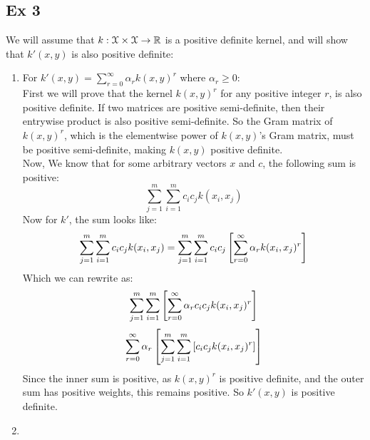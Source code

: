 \documentclass[12pt]{article}
\begin{document}
\newpage

\subsection*{Ex 3}
We will assume that $k: \mathcal{X} \times \mathcal{X} \to \mathbb{R}$
is a positive definite kernel, and
will show that $k'(x, y)$ is also positive definite:
\begin{enumerate}[label = \letters]
    \item 
    For $k'(x, y) = \sum_{r=0}^\infty
    \alpha_r k(x, y)^r$ where $\alpha_r \geq 0$: \\
    First we will prove that the kernel $k(x, y)^r$
    for any positive integer $r$, is also positive 
    definite. If two matrices are positive semi-definite,
    then their entrywise product is also positive
    semi-definite. So the Gram matrix of $k(x, y)^r$,
    which is the elementwise power of
    $k(x, y)$'s Gram matrix, must be positive semi-definite,
    making $k(x, y)$ positive definite. \\
    Now, We know that for some arbitrary vectors $x$
    and $c$,
    the following sum is positive:
    \[ \sum_{j = 1}^m\sum_{i=1}^m c_ic_j k(x_i, x_j) \]
    Now for $k'$, the sum looks like:
    \[ \sum_{j = 1}^m\sum_{i=1}^m c_ic_j k(x_i, x_j)
    = \sum_{j = 1}^m\sum_{i=1}^m c_ic_j 
    \left[ \sum_{r=0}^\infty \alpha_r k(x_i, x_j)^r \right] \]
    Which we can rewrite as:
    \[ \sum_{j = 1}^m\sum_{i=1}^m
    \left[ \sum_{r=0}^\infty \alpha_r c_ic_j k(x_i, x_j)^r \right] \]
    \[ \sum_{r=0}^\infty \alpha_r \left[ 
     \sum_{j = 1}^m\sum_{i=1}^m
    \left[  c_ic_j k(x_i, x_j)^r \right] \right] \]
    Since the inner sum is positive,
    as $k(x, y)^r$ is positive definite, and
    the outer sum has positive weights, this remains
    positive.
    So $k'(x, y)$ is positive definite. \\
    \item 
\end{enumerate}
\end{document}

